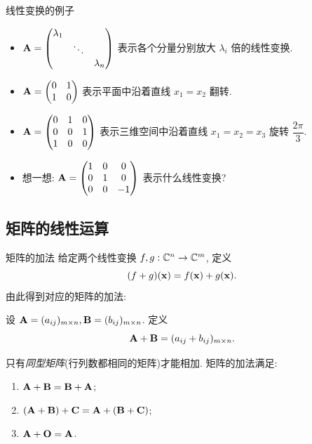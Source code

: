 \begin{frame}{线性变换的例子}
	\onslide<+->
	\begin{itemize}
		\item ${\mathbf{A}}=\begin{pmatrix}
			\lambda_1&&\\&\ddots&\\&&\lambda_n
		\end{pmatrix}$ 表示各个分量分别放大 $\lambda_i$ 倍的线性变换.
		\item ${\mathbf{A}}=\begin{pmatrix}
			0&1\\1&0
		\end{pmatrix}$ 表示平面中沿着直线 $x_1=x_2$ 翻转.
		\item ${\mathbf{A}}=\begin{pmatrix}
			0&1&0\\0&0&1\\1&0&0
		\end{pmatrix}$ 表示三维空间中沿着直线 $x_1=x_2=x_3$ 旋转 $\dfrac{2\pi}3$.
		\item 想一想: ${\mathbf{A}}=\begin{pmatrix}
			1&0&0\\0&1&0\\0&0&-1
		\end{pmatrix}$ 表示什么线性变换?
	\end{itemize}
\end{frame}


\subsection{矩阵的线性运算}
\begin{frame}{矩阵的加法}
	\onslide<+->
	给定两个线性变换 $f,g:{\mathbb{C}}^n\rightarrow{\mathbb{C}}^m$, 定义
	\[(f+g)({\mathbf{x}})=f({\mathbf{x}})+g({\mathbf{x}}).\]
	\onslide<+->
	由此得到对应的矩阵的加法:
	\onslide<+->
	\begin{definition}
		设 ${\mathbf{A}}=(a_{ij})_{m\times n},{\mathbf{B}}=(b_{ij})_{m\times n}$.
		定义
		\[{\mathbf{A}}+{\mathbf{B}}=(a_{ij}+b_{ij})_{m\times n}.\]
	\end{definition}
	\onslide<+->
	只有\emph{同型矩阵}(行列数都相同的矩阵)才能相加.
	\onslide<+->
	矩阵的加法满足:
	\begin{enumerate}
		\item ${\mathbf{A}}+{\mathbf{B}}={\mathbf{B}}+{\mathbf{A}}$;
		\item $({\mathbf{A}}+{\mathbf{B}})+{\mathbf{C}}={\mathbf{A}}+({\mathbf{B}}+{\mathbf{C}})$;
		\item ${\mathbf{A}}+{\mathbf{O}}={\mathbf{A}}$.
	\end{enumerate}
\end{frame}



